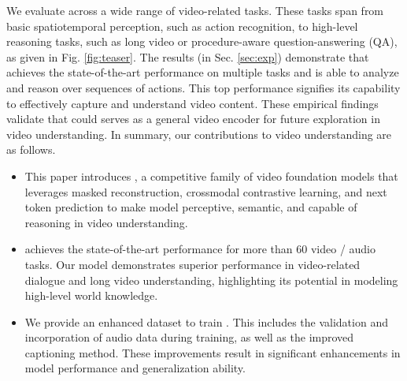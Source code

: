 We evaluate {\modelname} across a wide range of video-related tasks. These tasks span from basic spatiotemporal perception, such as action recognition, to high-level reasoning tasks, such as long video or procedure-aware question-answering (QA), as given in Fig. \ref{fig:teaser}. The results (in Sec. \ref{sec:exp}) demonstrate that {\modelname} achieves the state-of-the-art performance on multiple tasks and is able to analyze and reason over sequences of actions. This top performance signifies its capability to effectively capture and understand video content. These empirical findings validate that {\modelname} could serves as a general video encoder for future exploration in video understanding. In summary, our contributions to video understanding are as follows.
\begin{itemize}[leftmargin=*]
\item[$\bullet$] This paper introduces {\modelname}, a competitive family of video foundation models that leverages masked reconstruction, crossmodal contrastive learning, and next token prediction to make model perceptive, semantic, and capable of reasoning in video understanding. 
\item[$\bullet$] {\modelname} achieves the state-of-the-art performance for more than 60 video / audio tasks. Our model demonstrates superior performance in video-related dialogue and long video understanding, highlighting its potential in modeling high-level world knowledge.
\item[$\bullet$] We provide an enhanced dataset to train {\modelname}. This includes the validation and incorporation of audio data during training, as well as the improved captioning method. These improvements result in significant enhancements in model performance and generalization ability.
\end{itemize}